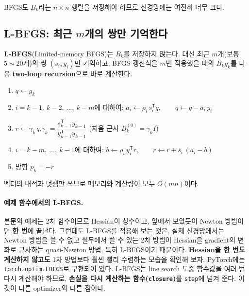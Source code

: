 \documentclass[11pt,a4paper]{article}
\newcommand{\T}{^{\mathsf T}}
\begin{document}
BFGS도 $B_k$라는 $n\times n$ 행렬을 저장해야 하므로 신경망에는 여전히 너무 크다.

\subsection{L-BFGS: 최근 $m$개의 쌍만 기억한다}

\textbf{L-BFGS}(Limited-memory BFGS)는 $B_k$를 저장하지 않는다.
대신 최근 $m$개(보통 $5\sim20$개)의 쌍 $(s_i,y_i)$만 기억하고,
BFGS 갱신식을 $m$번 적용했을 때의 $B_kg_k$를 다음 \textbf{two-loop recursion}으로 바로 계산한다.

\begin{remarkbox}
\begin{enumerate}[leftmargin=1.8em]
\item $q\leftarrow g_k$
\item $i=k-1,\ k-2,\ \ldots,\ k-m$에 대하여:\quad
$a_i\leftarrow\rho_i\,s_i\T q,\qquad q\leftarrow q-a_i\,y_i$
\item $r\leftarrow\gamma_k\,q$,\quad $\gamma_k=\dfrac{s_{k-1}\T y_{k-1}}{y_{k-1}\T y_{k-1}}$
\quad (처음 근사 $B_k^{(0)}=\gamma_kI$)
\item $i=k-m,\ \ldots,\ k-1$에 대하여:\quad
$b\leftarrow\rho_i\,y_i\T r,\qquad r\leftarrow r+s_i\,(a_i-b)$
\item 방향 $p_k=-r$
\end{enumerate}
벡터의 내적과 덧셈만 쓰므로 메모리와 계산량이 모두 $O(mn)$이다.
\end{remarkbox}

\paragraph{예제 함수에서의 L-BFGS.}
본문의 예제는 2차 함수이므로 Hessian이 상수이고, 앞에서 보았듯이 Newton 방법이면 \textbf{한 번}에 끝난다.
그런데도 L-BFGS를 적용해 보는 것은, 실제 신경망에서는 Newton 방법을 쓸 수 없고
실무에서 쓸 수 있는 2차 방법이 Hessian을 gradient의 변화로 근사하는 quasi-Newton 방법,
특히 L-BFGS이기 때문이다.
\textbf{Hessian을 한 번도 계산하지 않고도} 1차 방법보다 훨씬 빨리 수렴하는 모습을 확인해 보자.
PyTorch에는 \texttt{torch.optim.LBFGS}로 구현되어 있다.
L-BFGS는 line search 도중 함수값을 여러 번 다시 계산해야 하므로,
\textbf{손실을 다시 계산하는 함수(\texttt{closure})}를 \texttt{step}에 넘겨 준다.
이것이 다른 optimizer와 다른 점이다.
\end{document}
